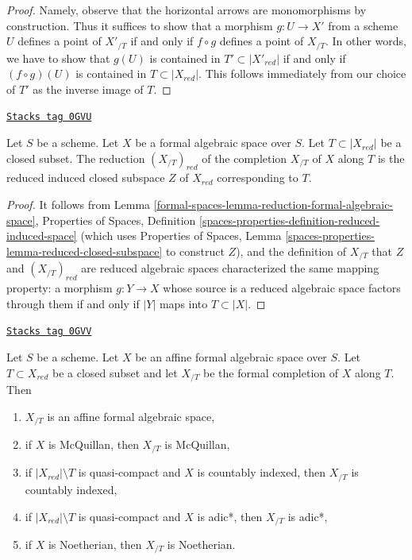 \begin{proof}
Namely, observe that the horizontal arrows are monomorphisms
by construction. Thus it suffices to show that a morphism
$g : U \to X'$ from a scheme $U$ defines a point of $X'_{/T}$
if and only if $f \circ g$ defines a point of $X_{/T}$.
In other words, we have to show that
$g(U)$ is contained in $T' \subset |X'_{red}|$
if and only if $(f \circ g)(U)$ is contained in $T \subset |X_{red}|$.
This follows immediately from our choice of $T'$ as the
inverse image of $T$.
\end{proof}

\begin{lemma}
\label{formal-spaces-lemma-reduction-recompletion}
\href{https://stacks.math.columbia.edu/tag/0GVU}{\texttt{Stacks tag 0GVU}}

Let $S$ be a scheme. Let $X$ be a formal algebraic space over $S$.
Let $T \subset |X_{red}|$ be a closed subset. The reduction
$(X_{/T})_{red}$ of the completion $X_{/T}$ of $X$ along $T$ is
the reduced induced closed subspace $Z$ of $X_{red}$ corresponding to $T$.
\end{lemma}

\begin{proof}
It follows from Lemma \ref{formal-spaces-lemma-reduction-formal-algebraic-space},
Properties of Spaces, Definition
\ref{spaces-properties-definition-reduced-induced-space}
(which uses Properties of Spaces, Lemma
\ref{spaces-properties-lemma-reduced-closed-subspace} to construct $Z$),
and the definition of $X_{/T}$ that
$Z$ and $(X_{/T})_{red}$ are reduced algebraic spaces
characterized the same mapping property:
a morphism $g : Y \to X$ whose source is a reduced algebraic space
factors through them if and only if $|Y|$ maps into $T \subset |X|$.
\end{proof}

\begin{lemma}
\label{formal-spaces-lemma-recompletion-affine-types}
\href{https://stacks.math.columbia.edu/tag/0GVV}{\texttt{Stacks tag 0GVV}}

Let $S$ be a scheme. Let $X$ be an affine formal algebraic space over $S$.
Let $T \subset X_{red}$ be a closed subset and let $X_{/T}$
be the formal completion of $X$ along $T$. Then
\begin{enumerate}
\item $X_{/T}$ is an affine formal algebraic space,
\item if $X$ is McQuillan, then $X_{/T}$ is McQuillan,
\item if $|X_{red}| \setminus T$ is quasi-compact and $X$
is countably indexed, then $X_{/T}$ is countably indexed,
\item if $|X_{red}| \setminus T$ is quasi-compact and $X$
is adic*, then $X_{/T}$ is adic*,
\item if $X$ is Noetherian, then $X_{/T}$ is Noetherian.
\end{enumerate}
\end{lemma}

